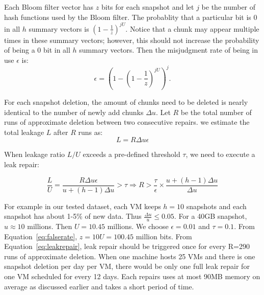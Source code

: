 Each Bloom filter vector has  $z$ bits for each snapshot and let $j$ be the number of hash functions used by the
Bloom filter. The probablity that a particular bit is 0  in all $h$ summary vectors is  
$(1- \frac{1}{z}) ^{j U}$. Notice that a chunk may appear multiple times in these summary vectors; however, this should not 
increase the probability of being a 0 bit in all $h$ summary vectors.
Then the misjudgment rate of being in use $\epsilon$ is: 
\begin{equation}
\label{eq:falserate}
\epsilon = (1-(1-\frac{1}{z})^{jU})^j.
\end{equation}


For each snapshot deletion, the amount of chunks need to be deleted is nearly identical to the number of
newly add chunks $\Delta u$. 
Let $R$ be the total number of runs of approximate deletion between two consecutive 
repairs. we estimate  the total leakage $L$ after $R$ runs as:
\[
L = R \Delta u \epsilon
\]

When leakage ratio $L/U$ exceeds a pre-defined threshold $\tau$, we need to execute a leak repair:

\begin{equation}
\label{eq:leakrepair}
\frac{L}{U} = \frac{R \Delta u \epsilon}{u+(h-1)\Delta u } > \tau 
\Longrightarrow R > \frac{\tau}{\epsilon}\times\frac{u + (h-1)\Delta u}{\Delta u}
\end{equation}

For example in our tested dataset,  
each VM keeps $h=10$ snapshots and each snapshot has
about 1-5\% of new data. Thus $\frac{\Delta u}{u} \leq 0.05$. For a 40GB snapshot, $u\approx  10$ millions.
Then $U=10.45$ millions.
We choose  $\epsilon = 0.01$ and $\tau=0.1$.  From Equation~\ref{eq:falserate}, 
$z=10U=100.45$ million bits. From Equation~\ref{eq:leakrepair}, 
leak repair should be triggered once for every R=290 runs of approximate deletion. 
When one machine hosts 25 VMs and there is one snapshot deletion per day per VM, there would be 
only one full leak repair for one VM scheduled for every 12 days. Each repairs uses at most  90MB memory on average
as discussed earlier and takes a short period of time.

